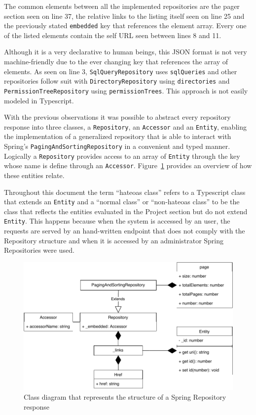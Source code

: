 The common elements between all the implemented repositories are the pager section seen on line 37, the relative links to the listing itself seen on line 25 and the previously stated \texttt{\textunderscore embedded} key that references the element array. Every one of the listed elements contain the self \gls{URL} seen between lines 8 and 11.

Although it is a very declarative to human beings, this \gls{JSON} format is not very machine-friendly due to the ever changing key that references the array of elements. As seen on line 3, \texttt{SqlQueryRepository} uses \texttt{sqlQueries} and other repositories follow suit with \texttt{DirectoryRepository} using \texttt{directories} and \texttt{PermissionTreeRepository} using \texttt{permissionTrees}. This approach is not easily modeled in Typescript. 

With the previous observations it was possible to abstract every repository response into three classes, a \texttt{Repository}, an \texttt{Accessor} and an \texttt{Entity}, enabling the implementation of a generalized repository that is able to interact with Spring's \texttt{PagingAndSortingRepository} in a convenient and typed manner.
Logically a \texttt{Repository} provides access to an array of \texttt{Entity} through the key whose name is define through an \texttt{Accessor}. Figure~\ref{fig:springresponse} provides an overview of how these entities relate.

Throughout this document the term ``hateoas class'' refers to a Typescript class that extends an \texttt{Entity} and a ``normal class'' or ``non-hateoas class'' to be the class that reflects the entities evaluated in the Project section but do not extend \texttt{Entity}. This happens because when the system is accessed by an user, the requests are served by an hand-written endpoint that does not comply with the Repository structure and when it is accessed by an administrator Spring Repositories were used.

\begin{figure}
  \centering
  \includegraphics[width=.8\textwidth]{images/diagramas/hateoas_diagram}
  \caption{Class diagram that represents the structure of a Spring Repository response}\label{fig:springresponse}
\end{figure}


